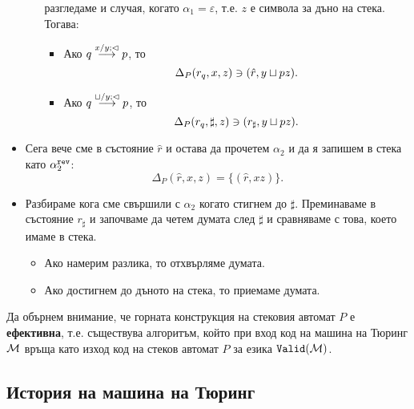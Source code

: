 \begin{hint}
\begin{itemize}
\begin{itemize}
      разгледаме и случая, когато $\alpha_1 = \varepsilon$, т.е. $z$ е символа за дъно на стека. Тогава:
      \begin{itemize}
      \item
        Ако $q \overset{x/y;\lhd}{\longrightarrow} p$, то
        \[\Delta_{P}(r_q,x,z) \ni (\hat{r},y\sqcup pz).\]
      \item
        Ако $q \overset{\sqcup/y;\lhd}{\longrightarrow} p$, то
        \[\Delta_{P}(r_q,\sharp,z) \ni (r_\sharp,y\sqcup pz).\]
      \end{itemize}
    \end{itemize}
  \item
    Сега вече сме в състояние $\hat{r}$ и остава да прочетем $\alpha_2$ и да я запишем в стека като $\alpha^{\texttt{rev}}_2$:
    \[\Delta_{P}(\hat{r},x,z) = \{(\hat{r}, xz)\}.\]
  \item
    Разбираме кога сме свършили с $\alpha_2$ когато стигнем до $\sharp$. Преминаваме в състояние $r_\sharp$ и
    започваме да четем думата след $\sharp$ и сравняваме с това, което имаме в стека.
    \begin{itemize}
    \item
      Ако намерим разлика, то отхвърляме думата.
    \item
      Ако достигнем до дъното на стека, то приемаме думата.
    \end{itemize}
  \end{itemize}
\end{hint}

\begin{remark}
  Да обърнем внимание, че горната конструкция на стековия автомат $P$ е {\bf ефективна}, т.е.
  съществува алгоритъм, който при вход код на машина на Тюринг $\mathcal{M}$ връща като изход код на стеков автомат $P$ за езика $\texttt{Valid}(\mathcal{M})$.
\end{remark}

\subsection*{История на машина на Тюринг}


